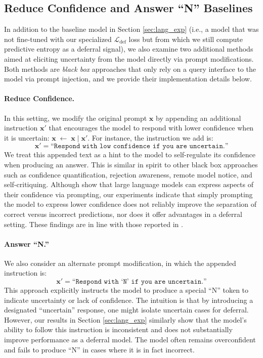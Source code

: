 \subsection{Reduce Confidence and Answer ``N'' Baselines}
\label{app:uncertainty_appendix}

In addition to the baseline model in Section \ref{sec:lang_exp} (i.e., a model that was not fine-tuned with our specialized \(\mathcal{L}_{\text{def}}\) loss but from which we still compute predictive entropy as a deferral signal), we also examine two additional methods aimed at eliciting uncertainty from the model directly via prompt modifications. Both methods are \textit{black box} approaches that only rely on a query interface to the model via prompt injection, and we provide their implementation details below.

\paragraph{Reduce Confidence.}
In this setting, we modify the original prompt \(\mathbf{x}\) by appending an additional instruction \(\mathbf{x}'\) that encourages the model to respond with lower confidence when it is uncertain: $\mathbf{x} \;\leftarrow\; \mathbf{x} \;\big\vert\; \mathbf{x}'$.
For instance, the instruction we add is:
\[
    \mathbf{x}' = \texttt{``Respond with low confidence if you are uncertain.''}
\]
We treat this appended text as a hint to the model to self-regulate its confidence when producing an answer. This is similar in spirit to other black box approaches such as confidence quantification, rejection awareness, remote model notice, and self-critiquing. Although \citet{xiong2024can} show that large language models can express aspects of their confidence via prompting, our experiments indicate that simply prompting the model to express lower confidence does not reliably improve the separation of correct versus incorrect predictions, nor does it offer advantages in a deferral setting. These findings are in line with those reported in \cite{kadavath2022language}.

\paragraph{Answer ``N.''}
We also consider an alternate prompt modification, in which the appended instruction is:
\[
    \mathbf{x}' = \texttt{``Respond with `N' if you are uncertain.''}
\]
This approach explicitly instructs the model to produce a special ``N'' token to indicate uncertainty or lack of confidence. The intuition is that by introducing a designated ``uncertain'' response, one might isolate uncertain cases for deferral. However, our results in Section \ref{sec:lang_exp} similarly show that the model’s ability to follow this instruction is inconsistent and does not substantially improve performance as a deferral model. The model often remains overconfident and fails to produce ``N'' in cases where it is in fact incorrect.

